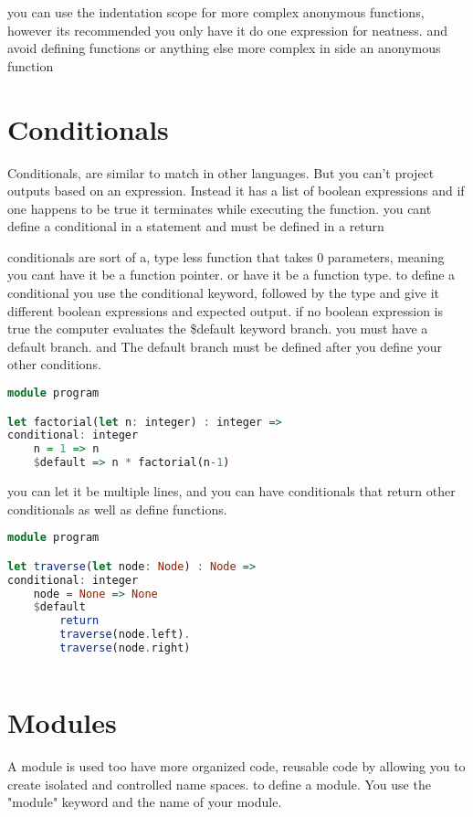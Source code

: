 \documentclass{article}
\begin{document}
you can use the indentation scope for more complex anonymous functions, however its recommended you only have it do one expression for neatness. and avoid defining functions or anything else more complex in side an anonymous function

\section{Conditionals}

Conditionals, are similar to match in other languages. But you can't project outputs based on an expression. Instead it has a list of boolean expressions and if one happens to be true it terminates while executing the function. you cant define a conditional in a statement and must be defined in a return

conditionals are sort of a, type less function that takes 0 parameters, meaning you cant have it be a function pointer. or have it be a function type.  
to define a conditional you use the conditional keyword, followed by the type and give it different boolean expressions and expected output. if no boolean expression is true the computer evaluates the \$default keyword branch. 
you must have a default branch. and The default branch must be defined after you define your other conditions.

\begin{lstlisting}[language=Haskell, caption=How to define a conditional]
module program

let factorial(let n: integer) : integer =>
conditional: integer 
    n = 1 => n
    $default => n * factorial(n-1)	

\end{lstlisting}

you can let it be multiple lines, and you can have conditionals that return other conditionals
as well as define functions.



\begin{lstlisting}[language=Haskell, caption=Multi-line conditional branches]
module program

let traverse(let node: Node) : Node =>
conditional: integer 
    node = None => None
    $default										   
        return 
        traverse(node.left).
        traverse(node.right)
    
\end{lstlisting}


\section{Modules}
A module is used too have more organized code, reusable code by allowing you to create isolated and controlled name spaces. 
to define a module. You use the "module" keyword and the name of your module.
\end{document}
